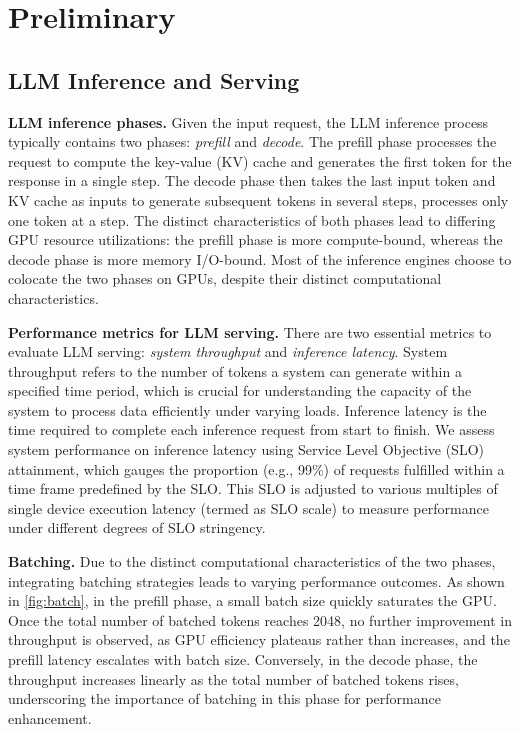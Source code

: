 \section{Preliminary}
\subsection{LLM Inference and Serving}

\textbf{LLM inference phases.} Given the input request, the LLM inference process typically contains two phases: \textit{prefill} and \textit{decode}. The prefill phase processes the request to compute the key-value (KV) cache and generates the first token for the response in a single step. The decode phase then takes the last input token and KV cache as inputs to generate subsequent tokens in several steps, processes only one token at a step. The distinct characteristics of both phases lead to differing GPU resource utilizations: the prefill phase is more compute-bound, whereas the decode phase is more memory I/O-bound. Most of the inference engines choose to colocate the two phases on GPUs, despite their distinct computational characteristics.

\textbf{Performance metrics for LLM serving.}
\label{sec:slo}
There are two essential metrics to evaluate LLM serving: \textit{system throughput} and \textit{inference latency}. System throughput refers to the number of tokens a system can generate within a specified time period, which is crucial for understanding the capacity of the system to process data efficiently under varying loads. Inference latency is the time required to complete each inference request from start to finish. We assess system performance on inference latency using Service Level Objective (SLO) attainment, which gauges the proportion (e.g., 99\%) of requests fulfilled within a time frame predefined by the SLO. This SLO is adjusted to various multiples of single device execution latency (termed as SLO scale) to measure performance under different degrees of SLO stringency.

\textbf{Batching.}
\label{sec:batching}
Due to the distinct computational characteristics of the two phases, integrating batching strategies leads to varying performance outcomes. As shown in \autoref{fig:batch}, in the prefill phase, a small batch size quickly saturates the GPU. Once the total number of batched tokens reaches 2048, no further improvement in throughput is observed, as GPU efficiency plateaus rather than increases, and the prefill latency escalates with batch size. Conversely, in the decode phase, the throughput increases linearly as the total number of batched tokens rises, underscoring the importance of batching in this phase for performance enhancement.

